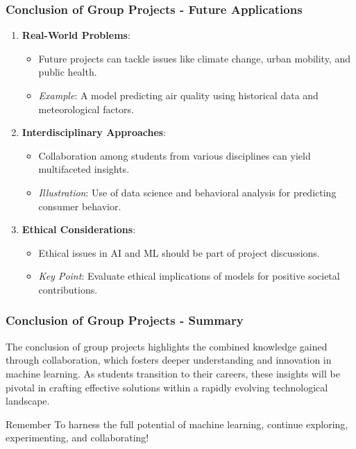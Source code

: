 \documentclass[aspectratio=169]{beamer}
\begin{document}
\begin{frame}[fragile]
  \frametitle{Conclusion of Group Projects - Future Applications}
  \begin{enumerate}
    \item \textbf{Real-World Problems}:
      \begin{itemize}
        \item Future projects can tackle issues like climate change, urban mobility, and public health.
        \item \textit{Example}: A model predicting air quality using historical data and meteorological factors.
      \end{itemize}
      
    \item \textbf{Interdisciplinary Approaches}:
      \begin{itemize}
        \item Collaboration among students from various disciplines can yield multifaceted insights.
        \item \textit{Illustration}: Use of data science and behavioral analysis for predicting consumer behavior.
      \end{itemize}
      
    \item \textbf{Ethical Considerations}:
      \begin{itemize}
        \item Ethical issues in AI and ML should be part of project discussions.
        \item \textit{Key Point}: Evaluate ethical implications of models for positive societal contributions.
      \end{itemize}
  \end{enumerate}
\end{frame}

\begin{frame}[fragile]
  \frametitle{Conclusion of Group Projects - Summary}
  The conclusion of group projects highlights the combined knowledge gained through collaboration, which fosters deeper understanding and innovation in machine learning. As students transition to their careers, these insights will be pivotal in crafting effective solutions within a rapidly evolving technological landscape.

  \begin{block}{Remember}
    To harness the full potential of machine learning, continue exploring, experimenting, and collaborating!
  \end{block}
\end{frame}
\end{document}
